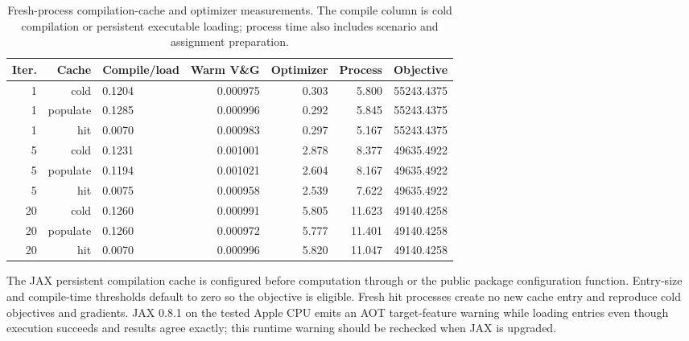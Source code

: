 \begin{table}[htbp]
\centering
\small
\begin{tabular}{rrlrrrr}
\hline
Iter. & Cache & Compile/load & Warm V\&G & Optimizer & Process & Objective \\
\hline
1  & cold     & 0.1204 & 0.000975 & 0.303 & 5.800  & 55243.4375 \\
1  & populate & 0.1285 & 0.000996 & 0.292 & 5.845  & 55243.4375 \\
1  & hit      & 0.0070 & 0.000983 & 0.297 & 5.167  & 55243.4375 \\
5  & cold     & 0.1231 & 0.001001 & 2.878 & 8.377  & 49635.4922 \\
5  & populate & 0.1194 & 0.001021 & 2.604 & 8.167  & 49635.4922 \\
5  & hit      & 0.0075 & 0.000958 & 2.539 & 7.622  & 49635.4922 \\
20 & cold     & 0.1260 & 0.000991 & 5.805 & 11.623 & 49140.4258 \\
20 & populate & 0.1260 & 0.000972 & 5.777 & 11.401 & 49140.4258 \\
20 & hit      & 0.0070 & 0.000996 & 5.820 & 11.047 & 49140.4258 \\
\hline
\end{tabular}
\caption{Fresh-process compilation-cache and optimizer measurements. The
compile column is cold compilation or persistent executable loading; process
time also includes scenario and assignment preparation.}
\label{tab:case-specific-ml-compilation-cache}
\end{table}

The JAX persistent compilation cache is configured before computation through
 or the public
package configuration function. Entry-size and compile-time thresholds default
to zero so the objective is eligible. Fresh hit processes create no new cache
entry and reproduce cold objectives and gradients. JAX 0.8.1 on the tested
Apple CPU emits an AOT target-feature warning while loading entries even though
execution succeeds and results agree exactly; this runtime warning should be
rechecked when JAX is upgraded.

